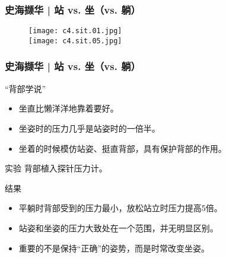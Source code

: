 \begin{frame}
  \frametitle{史海撷华 | 站 vs. 坐（vs. 躺）}
  \begin{figure}
    \centering
    \texttt{[image: c4.sit.01.jpg]}\\
    \texttt{[image: c4.sit.05.jpg]}
  \end{figure}
\end{frame}

\begin{frame}
  \frametitle{史海撷华 | 站 vs. 坐（vs. 躺）}
  \begin{block}{“背部学说”}
    \begin{itemize}
      \item 坐直比懒洋洋地靠着要好。
      \item 坐姿时的压力几乎是站姿时的一倍半。
      \item 坐着的时候模仿站姿、挺直背部，具有保护背部的作用。
    \end{itemize}
  \end{block}
  \pause
  \begin{block}{实验}
    背部植入探针压力计。
  \end{block}
  \pause
  \begin{block}{结果}
    \begin{itemize}
      \item 平躺时背部受到的压力最小，放松站立时压力提高5倍。
      \item 站姿和坐姿的压力大致处在一个范围，并无明显区别。
      \item 重要的不是保持“正确”的姿势，而是时常改变坐姿。
    \end{itemize}
  \end{block}
\end{frame}

